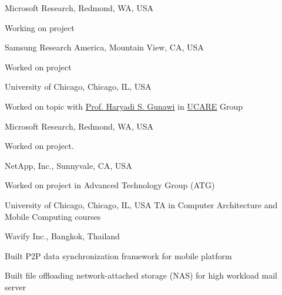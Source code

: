 \documentclass[10pt]{article} %
\begin{document}
{Microsoft Research, Redmond, WA, USA}
{\begin{minipage}{\smallertextwidth}
Working on  project
\end{minipage}}

{Samsung Research America, Mountain View, CA, USA}
{\begin{minipage}{\smallertextwidth}
Worked on  project
\end{minipage}}

{University of Chicago, Chicago, IL, USA}
{\begin{minipage}{\smallertextwidth}
Worked on  topic
with \href{http://ucare.cs.uchicago.edu/}{Prof. Haryadi S. Gunawi}
in \href{http://ucare.cs.uchicago.edu/}{UCARE} Group
\end{minipage}} 

{Microsoft Research, Redmond, WA, USA}
{\begin{minipage}{\smallertextwidth}
Worked on  project.
\end{minipage}} 


{NetApp, Inc., Sunnyvale, CA, USA}
{\begin{minipage}{\smallertextwidth}
Worked on  project
in Advanced Technology Group (ATG)
\end{minipage}}

{University of Chicago, Chicago, IL, USA}
{TA in Computer Architecture and Mobile Computing courses} 

{Wavify Inc., Bangkok, Thailand}
{\begin{minipage}{\smallertextwidth}
\begin{itemize-noindent}
\setlength\itemsep{-1ex}
\item Built P2P data synchronization framework for mobile platform
\item Built file offloading network-attached storage (NAS) for high workload mail server
\end{itemize-noindent}
\end{minipage}}
\end{document}
